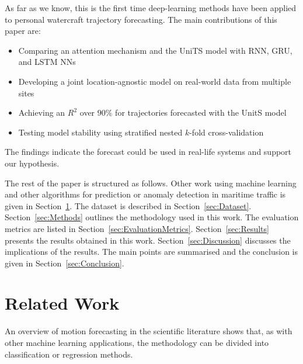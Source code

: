 \documentclass[preprint,12pt]{elsarticle}
\begin{document}
As far as we know, this is the first time deep-learning methods have been applied to personal watercraft trajectory forecasting. The main contributions of this paper are:

\begin{itemize}
    \item Comparing an attention mechanism and the UniTS model with RNN, GRU, and LSTM NNs
    \item Developing a joint location-agnostic model on real-world data from multiple sites
    \item Achieving an $R^{2}$ over $90\%$ for trajectories forecasted with the UnitS model
    \item Testing model stability using stratified nested $k$-fold cross-validation
\end{itemize}

The findings indicate the forecast could be used in real-life systems and support our hypothesis.

The rest of the paper is structured as follows. Other work using machine learning and other algorithms for prediction or anomaly detection in maritime traffic is given in Section~\ref{sec:Related}. The dataset is described in Section~\ref{sec:Dataset}. Section~\ref{sec:Methods} outlines the methodology used in this work. The evaluation metrics are listed in Section~\ref{sec:EvaluationMetrics}. Section~\ref{sec:Results} presents the results obtained in this work. Section~\ref{sec:Discussion} discusses the implications of the results. The main points are summarised and the conclusion is given in Section~\ref{sec:Conclusion}.

\section{Related Work}
\label{sec:Related}

An overview of motion forecasting in the scientific literature \citep{lefevre2014survey} shows that, as with other machine learning applications, the methodology can be divided into classification or regression methods.
\end{document}
